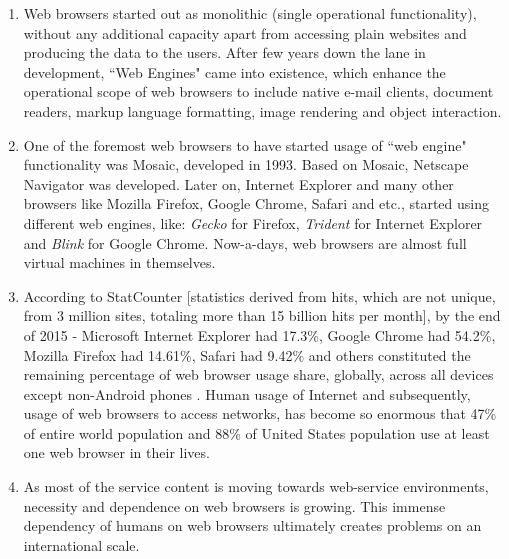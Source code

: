 \documentclass[12pt]{extarticle}
\begin{document}
	\begin{enumerate}
			
	
	\item Web browsers started out as monolithic (single operational functionality), without any additional capacity apart from accessing plain websites and producing the data to the users. After few years down the lane in development, ``Web Engines" came into existence, which enhance the operational scope of web browsers to include native e-mail clients, document readers, markup language formatting, image rendering and object interaction. 
	
	
	\item One of the foremost web browsers to have started usage of ``web engine" functionality was Mosaic, developed in 1993. Based on Mosaic, Netscape Navigator was developed. Later on, Internet Explorer and many other browsers like Mozilla Firefox, Google Chrome, Safari and etc., started using different web engines, like: \textit{Gecko} for Firefox, \textit{Trident} for Internet Explorer and \textit{Blink} for Google Chrome. Now-a-days, web browsers are almost full virtual machines in themselves.
	
	
	\item According to StatCounter [statistics derived from hits, which are not unique, from 3 million sites, totaling more than 15 billion hits per month], by the end of 2015 - Microsoft Internet Explorer had 17.3\%, Google Chrome had 54.2\%, Mozilla Firefox had 14.61\%, Safari had 9.42\% and others constituted the remaining percentage of web browser usage share, globally, across all devices except non-Android phones \cite{stat}. Human usage of Internet and subsequently, usage of web browsers to access networks, has become so enormous that 47\% of entire world population and 88\% of United States population use at least one web browser in their lives\cite{iwsstat}.
	
	
	\item As most of the service content is moving towards web-service environments, necessity and dependence on web browsers is growing. This immense dependency of humans on web browsers ultimately creates problems on an international scale.
	\end{enumerate}
	
	
\end{document}
